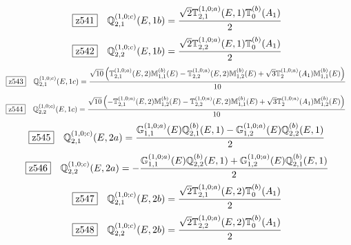 \documentclass[fleqn,10pt,landscape]{jsarticle}
\begin{document}
\begin{dmath*}
\hspace*{3mm}\fbox{z541}\quad \mathbb{Q}_{2,1}^{(1,0;c)}(E,1b)=\frac{\sqrt{2} \mathbb{T}_{2,1}^{(1,0;a)}(E,1) \mathbb{T}_{0}^{(b)}(A_{1})}{2}
\end{dmath*}
\begin{dmath*}
\hspace*{3mm}\fbox{z542}\quad \mathbb{Q}_{2,2}^{(1,0;c)}(E,1b)=\frac{\sqrt{2} \mathbb{T}_{2,2}^{(1,0;a)}(E,1) \mathbb{T}_{0}^{(b)}(A_{1})}{2}
\end{dmath*}
\begin{dmath*}
\hspace*{3mm}\fbox{z543}\quad \mathbb{Q}_{2,1}^{(1,0;c)}(E,1c)=\frac{\sqrt{10} \left(\mathbb{T}_{2,1}^{(1,0;a)}(E,2) \mathbb{M}_{1,1}^{(b)}(E) - \mathbb{T}_{2,2}^{(1,0;a)}(E,2) \mathbb{M}_{1,2}^{(b)}(E) + \sqrt{3} \mathbb{T}_{2}^{(1,0;a)}(A_{1}) \mathbb{M}_{1,1}^{(b)}(E)\right)}{10}
\end{dmath*}
\begin{dmath*}
\hspace*{3mm}\fbox{z544}\quad \mathbb{Q}_{2,2}^{(1,0;c)}(E,1c)=\frac{\sqrt{10} \left(- \mathbb{T}_{2,1}^{(1,0;a)}(E,2) \mathbb{M}_{1,2}^{(b)}(E) - \mathbb{T}_{2,2}^{(1,0;a)}(E,2) \mathbb{M}_{1,1}^{(b)}(E) + \sqrt{3} \mathbb{T}_{2}^{(1,0;a)}(A_{1}) \mathbb{M}_{1,2}^{(b)}(E)\right)}{10}
\end{dmath*}
\begin{dmath*}
\hspace*{3mm}\fbox{z545}\quad \mathbb{Q}_{2,1}^{(1,0;c)}(E,2a)=\frac{\mathbb{G}_{1,1}^{(1,0;a)}(E) \mathbb{Q}_{2,1}^{(b)}(E,1) - \mathbb{G}_{1,2}^{(1,0;a)}(E) \mathbb{Q}_{2,2}^{(b)}(E,1)}{2}
\end{dmath*}
\begin{dmath*}
\hspace*{3mm}\fbox{z546}\quad \mathbb{Q}_{2,2}^{(1,0;c)}(E,2a)=- \frac{\mathbb{G}_{1,1}^{(1,0;a)}(E) \mathbb{Q}_{2,2}^{(b)}(E,1) + \mathbb{G}_{1,2}^{(1,0;a)}(E) \mathbb{Q}_{2,1}^{(b)}(E,1)}{2}
\end{dmath*}
\begin{dmath*}
\hspace*{3mm}\fbox{z547}\quad \mathbb{Q}_{2,1}^{(1,0;c)}(E,2b)=\frac{\sqrt{2} \mathbb{T}_{2,1}^{(1,0;a)}(E,2) \mathbb{T}_{0}^{(b)}(A_{1})}{2}
\end{dmath*}
\begin{dmath*}
\hspace*{3mm}\fbox{z548}\quad \mathbb{Q}_{2,2}^{(1,0;c)}(E,2b)=\frac{\sqrt{2} \mathbb{T}_{2,2}^{(1,0;a)}(E,2) \mathbb{T}_{0}^{(b)}(A_{1})}{2}
\end{dmath*}
\end{document}
